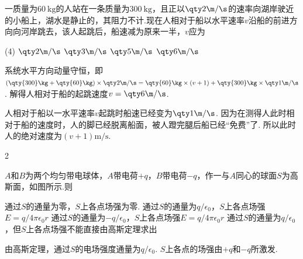 \begin{problem} %
    一质量为$\qty{60}\kg$的人站在一条质量为$\qty{300}\kg$，且正以$\qty2{\m/\s}$的速率向湖岸驶近的小船上，湖水是静止的，其阻力不计.现在人相对于船以水平速率$v$沿船的前进方向向河岸跳去，该人起跳后，船速减为原来一半，$v$应为
    \begin{tasks}(4)
        \task $\qty2{\m/\s}$
        \task $\qty3{\m/\s}$
        \task $\qty5{\m/\s}$
        \task[\true] $\qty6{\m/\s}$
    \end{tasks}
\end{problem}
\begin{solution}
    系统水平方向动量守恒，即$(\qty{300}\kg+\qty{60}\kg)\times\qty2{\m/\s}=\qty{60}\kg\times(v+1)+\qty{300}\kg\times \qty1{\m/\s}$. 解得人相对于船的起跳速度$v=\qty6{\m/\s}$.
\end{solution}
\begin{note}
    人相对于船以一水平速率$v$起跳时船速已经变为$\qty1{\m/\s}$. 因为在测得人此时相对于船的速度时，人的脚已经脱离船面，被人蹬完腿后船已经``免费''了. 所以此时人的绝对速度为$(v+1)\unit{\m/\s}$.
\end{note}

\begin{paracol}{2}
\begin{problem} %
    $A$和$B$为两个均匀带电球体，$A$带电荷$+q$，$B$带电荷$-q$，作一与$A$同心的球面$S$为高斯面，如图所示.则
    \switchcolumn\vspace*{\fill}\centering
    \vspace*{\fill}
    \switchcolumn
    \begin{tasks}
        \task 通过$S$的通量为零，$S$上各点场强为零.
        \task 通过$S$的通量为$q/\epsilon_0$，$S$上各点场强$E=q/4\pi\epsilon_0r$
        \task 通过$S$的通量为$-q/\epsilon_0$，$S$上各点场强$E=q/4\pi\epsilon_0r$
        \task[\true] 通过$S$的通量为$q/\epsilon_0$，但$S$上各点场强不能直接由高斯定理求出
    \end{tasks}
\end{problem}
\end{paracol}
\begin{solution}
    由高斯定理，通过$S$的电场强度通量为$q/\epsilon_0$. $S$上各点的场强由$+q$和$-q$所激发.
\end{solution}

